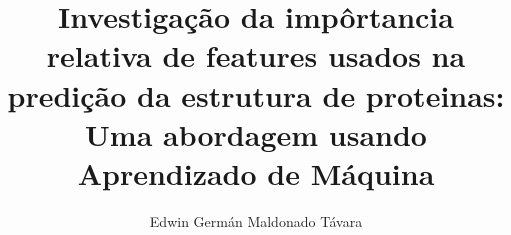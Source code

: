 \documentclass[
  phd,
  american
]{ThesisPUC}
\author{Edwin Germán Maldonado Távara}
\title{Investigação da impôrtancia relativa de features usados na
predição da estrutura de proteinas: 
Uma abordagem usando Aprendizado de Máquina}
\begin{document}
  
  
  
  
  \arial
  
  \normalfont
  
\end{document}

